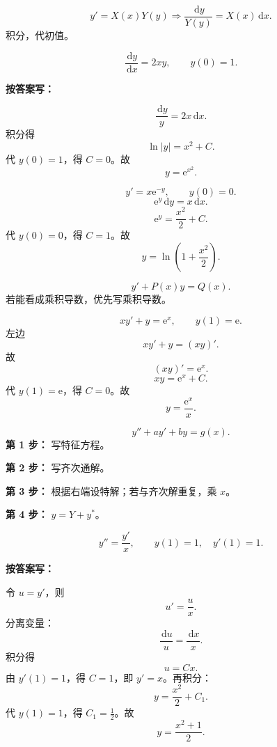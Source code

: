 \documentclass[11pt,a4paper,UTF8]{ctexart}
\newcommand{\dd}{\,\mathrm d}
\newcommand{\ee}{\mathrm e}
\begin{document}
\begin{templatebox}[类型 1：可分离变量]
\[
y'=X(x)Y(y)
\Rightarrow
\frac{\dd y}{Y(y)}=X(x)\dd x.
\]
积分，代初值。
\end{templatebox}

\begin{answerbox}[例：2020--2021]
\[
\frac{\dd y}{\dd x}=2xy,\qquad y(0)=1.
\]

\textbf{按答案写：}

\[
\frac{\dd y}{y}=2x\dd x.
\]
积分得
\[
\ln |y|=x^2+C.
\]
代 \(y(0)=1\)，得 \(C=0\)。故
\[
\boxed{y=\ee^{x^2}.}
\]
\end{answerbox}

\begin{answerbox}[例：2023--2024]
\[
y'=x\ee^{-y},\qquad y(0)=0.
\]
\[
\ee^y\dd y=x\dd x.
\]
\[
\ee^y=\frac{x^2}{2}+C.
\]
代 \(y(0)=0\)，得 \(C=1\)。故
\[
\boxed{y=\ln\left(1+\frac{x^2}{2}\right).}
\]
\end{answerbox}

\begin{templatebox}[类型 2：一阶线性]
\[
y'+P(x)y=Q(x).
\]
若能看成乘积导数，优先写乘积导数。
\end{templatebox}

\begin{answerbox}[例：2024--2025]
\[
xy'+y=\ee^x,\qquad y(1)=\ee.
\]
左边
\[
xy'+y=(xy)'.
\]
故
\[
(xy)'=\ee^x.
\]
\[
xy=\ee^x+C.
\]
代 \(y(1)=\ee\)，得 \(C=0\)。故
\[
\boxed{y=\frac{\ee^x}{x}.}
\]
\end{answerbox}

\begin{templatebox}[类型 3：二阶常系数]
\[
y''+ay'+by=g(x).
\]
\textbf{第 1 步：} 写特征方程。

\textbf{第 2 步：} 写齐次通解。

\textbf{第 3 步：} 根据右端设特解；若与齐次解重复，乘 \(x\)。

\textbf{第 4 步：} \(y=Y+y^*\)。
\end{templatebox}

\begin{answerbox}[例：二阶可降阶，2021--2022]
\[
y''=\frac{y'}{x},\qquad y(1)=1,\quad y'(1)=1.
\]

\textbf{按答案写：}

令 \(u=y'\)，则
\[
u'=\frac ux.
\]
分离变量：
\[
\frac{\dd u}{u}=\frac{\dd x}{x}.
\]
积分得
\[
u=Cx.
\]
由 \(y'(1)=1\)，得 \(C=1\)，即 \(y'=x\)。再积分：
\[
y=\frac{x^2}{2}+C_1.
\]
代 \(y(1)=1\)，得 \(C_1=\frac12\)。故
\[
\boxed{y=\frac{x^2+1}{2}.}
\]
\end{answerbox}
\end{document}
